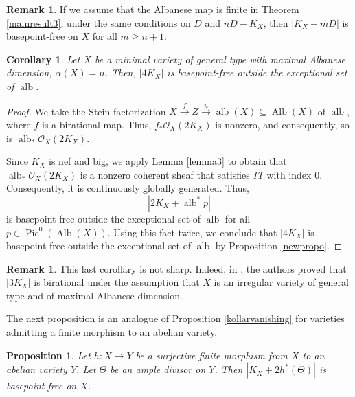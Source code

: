 \documentclass[sn-mathphys-num]{sn-jnl}%
\newtheorem{corollary}[theorem]{Corollary}
\newtheorem{proposition}[theorem]{Proposition}
\theoremstyle{definition}
\newtheorem{remark}[theorem]{Remark}
\numberwithin{equation}{section}
\begin{document}
\begin{remark}
    If we assume that the Albanese map is finite in Theorem \ref{mainresult3}, under the same conditions on $D$ and $nD - K_{X}$, then $|K_{X} + mD|$ is basepoint-free on $X$ for all $m \geq n+1$.  
\end{remark}
\begin{corollary}\label{mainresult4}
Let $X$ be a minimal variety of general type with maximal Albanese dimension, $\alpha(X) = n$. Then, $|4K_{X}|$ is basepoint-free outside the exceptional set of $\operatorname{alb}$. 
\end{corollary}
\begin{proof}
We take the Stein factorization $X \xrightarrow{f} Z \xrightarrow{u} \operatorname{alb}(X) \subseteq \operatorname{Alb}(X)$ of $\operatorname{alb}$, where $f$ is a birational map. Thus, $f_{*}\mathcal{O}_{X}(2K_{X})$ is nonzero, and consequently, so is $\operatorname{alb}_{*}\mathcal{O}_{X}(2K_{X})$.
\par Since $K_{X}$ is nef and big, we apply Lemma \ref{lemma3} to obtain that
$\operatorname{alb}_{*}\mathcal{O}_{X}(2K_{X})$ is a nonzero coherent sheaf that satisfies \emph{IT} with index $0$. Consequently, it is continuously globally generated. Thus,
\[
|2K_{X} + \operatorname{alb}^{*}p|
\]
is basepoint-free outside the exceptional set of $\operatorname{alb}$ for all $p \in \operatorname{Pic}^{0}(\operatorname{Alb}(X))$. Using this fact twice, we conclude that  $|4K_{X}|$ is basepoint-free outside the exceptional set of $\operatorname{alb}$ by Proposition \ref{newpropo}.
\end{proof}
\begin{remark}
This last corollary is not sharp. Indeed, in \cite{trio}, the authors proved that $|3K_{X}|$ is birational under the assumption that $X$ is an irregular variety of general type and of maximal Albanese dimension. 
\end{remark}
The next proposition is an analogue of Proposition \ref{kollarvanishing} for varieties admitting a finite morphism to an abelian variety.
\begin{proposition}
   Let $h: X \to Y$ be a surjective finite morphism  from $X$ to an abelian variety $Y$. Let $\Theta$ be an ample divisor on $Y$. Then $|K_{X} + 2 h^{*}(\Theta)|$ is basepoint-free on $X$. 
\end{proposition}
\end{document}
